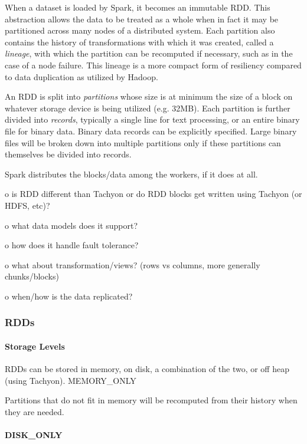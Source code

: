 When a dataset is loaded by Spark, it becomes an immutable RDD. This
abstraction allows the data to be treated as a whole when in fact it may
be partitioned across many nodes of a distributed system. Each partition
also contains the history of transformations with which it was created,
called a \emph{lineage}, with which the partition can be recomputed if
necessary, such as in the case of a node failure. This lineage is a more
compact form of resiliency compared to data duplication as utilized by
Hadoop.

An RDD is split into \emph{partitions} whose size is at minimum the size
of a block on whatever storage device is being utilized (e.g. 32MB).
Each partition is further divided into \emph{records}, typically a
single line for text processing, or an entire binary file for binary
data. Binary data records can be explicitly specified. Large binary
files will be broken down into multiple partitions only if these
partitions can themselves be divided into records.

Spark distributes the blocks/data among the workers, if it does at all.

o is RDD different than Tachyon or do RDD blocks get written using
Tachyon (or HDFS, etc)?

o what data models does it support?

o how does it handle fault tolerance?

o what about transformation/views? (rows vs columns, more generally
chunks/blocks)

o when/how is the data replicated?

\subsubsection{RDDs}\label{section}

\paragraph{Storage Levels}\label{storage-levels}

RDDs can be stored in memory, on disk, a combination of the two, or off
heap (using Tachyon). MEMORY\_ONLY

Partitions that do not fit in memory will be recomputed from their
history when they are needed.

\paragraph{DISK\_ONLY}\label{diskux5fonly}

